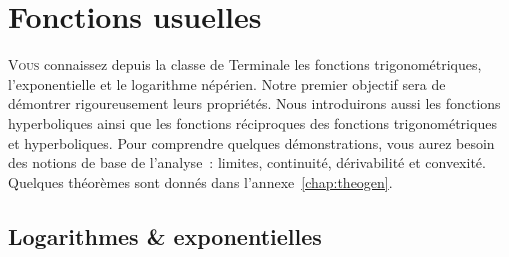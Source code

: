 \chapter{Fonctions usuelles}
\label{chap:fonctionsusuelles}
\minitoc
\minilof
\minilot
%
\lettrine{V}{ous} connaissez depuis la classe de Terminale les fonctions trigonométriques, l’exponentielle et le logarithme népérien. Notre premier objectif sera de démontrer rigoureusement leurs propriétés. Nous introduirons aussi les fonctions hyperboliques ainsi que les fonctions réciproques des fonctions trigonométriques et hyperboliques. Pour comprendre quelques démonstrations, vous aurez besoin des notions de base de l’analyse~: limites, continuité, dérivabilité et convexité. Quelques théorèmes sont donnés dans l'annexe~\ref{chap:theogen}.
%
\section{Logarithmes \& exponentielles}
\label{sec:chap1-logetexp}
%
